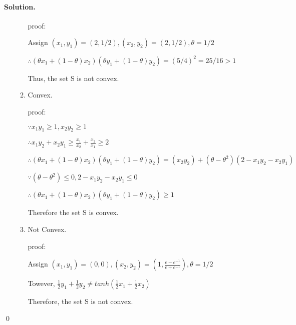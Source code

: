 \documentclass[a4paper]{article}
\newenvironment{solution}
{\color{blue} \paragraph{Solution.}}
{\newline \qed}
\begin{document}
\begin{solution}
\begin{enumerate}[a)]
\begin{enumerate}[1)]
            proof:

            Assign $(x_1, y_1)=(2, 1/2), (x_2, y_2)=(2, 1/2), \theta=1/2$

            $\therefore (\theta x_1 + (1-\theta)x_2)(\theta y_1 + (1-\theta)y_2)=(5/4)^2=25/16>1$

            Thus, the set S is not convex.

            \item Convex.
            
            proof:

            $\because x_1y_1\geq 1, x_2y_2\geq 1$

            $\therefore x_1y_2+x_2y_1\geq \frac{x_1}{x_2}+\frac{x_2}{x_1}\geq 2$

            $\therefore (\theta x_1 + (1-\theta)x_2)(\theta y_1 + (1-\theta)y_2)=(x_2y_2)+(\theta-\theta^2)(2-x_1y_2-x_2y_1)$

            $\because (\theta-\theta^2)\leq 0, 2-x_1y_2-x_2y_1\leq 0$

            $\therefore (\theta x_1 + (1-\theta)x_2)(\theta y_1 + (1-\theta)y_2)\geq 1$

            Therefore the set S is convex.

            \item Not Convex.
            
            proof:

            Assign $(x_1, y_1)=(0,0), (x_2, y_2)=(1, \frac{e-e^{-1}}{e+e^{-1}}), \theta=1/2$

            Towever, $\frac 12y_1+\frac 12y_2 \not = tanh(\frac 12x_1+\frac12 x_2)$

            Therefore, the set S is not convex.

        \end{enumerate}
    \end{enumerate}
\end{solution}
\end{document}
